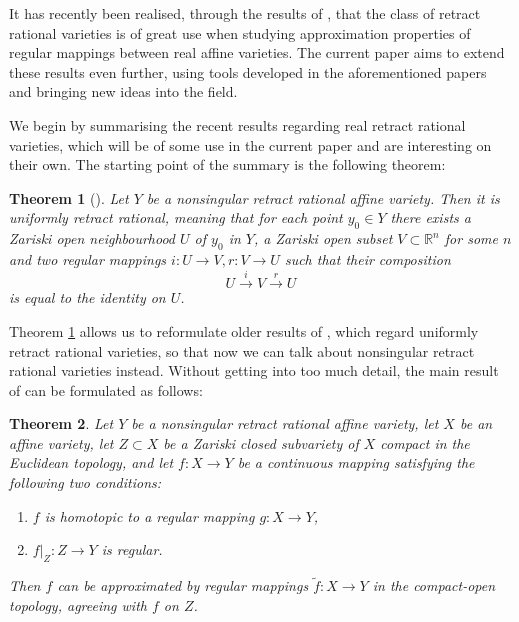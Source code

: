 \documentclass{article}
\theoremstyle{plain}
\newtheorem{thm}{Theorem}[section]
\theoremstyle{definition}
\theoremstyle{remark}
\newcommand{\R}{\mathbb{R}}
\begin{document}
It has recently been realised, through the results of \cite{baneckiRelativeStoneWeierstrassTheorem2024,baneckiRetractRationalVarieties2025}, that the class of retract rational varieties is of great use when studying approximation properties of regular mappings between real affine varieties. The current paper aims to extend these results even further, using tools developed in the aforementioned papers and bringing new ideas into the field. 

We begin by summarising the recent results regarding real retract rational varieties, which will be of some use in the current paper and are interesting on their own. The starting point of the summary is the following theorem:
\begin{thm}[{\cite[Theorem 1.8]{baneckiRetractRationalVarieties2025}}]\label{baneckiRetractRationalVarieties2025}
Let $Y$ be a nonsingular retract rational affine variety. Then it is \emph{uniformly retract rational}, meaning that for each point $y_0\in Y$ there exists a Zariski open neighbourhood $U$ of $y_0$ in $Y$, a Zariski open subset $V\subset \R^n$ for some $n$ and two regular mappings $i:U\rightarrow V, r:V\rightarrow U$ such that their composition
\begin{equation*}
    U\xrightarrow{i} V\xrightarrow{r} U 
\end{equation*}
is equal to the identity on $U$.
\end{thm}

Theorem \ref{baneckiRetractRationalVarieties2025} allows us to reformulate older results of \cite{baneckiRelativeStoneWeierstrassTheorem2024}, which regard uniformly retract rational varieties, so that now we can talk about nonsingular retract rational varieties instead. Without getting into too much detail, the main result of \cite{baneckiRelativeStoneWeierstrassTheorem2024} can be formulated as follows:
\begin{thm}\label{approx_thm}
Let $Y$ be a nonsingular retract rational affine variety, let $X$ be an affine variety, let $Z\subset X$ be a Zariski closed subvariety of $X$ compact in the Euclidean topology, and let $f:X\rightarrow Y$ be a continuous mapping satisfying the following two conditions:
\begin{enumerate}
    \item $f$ is homotopic to a regular mapping $g:X\rightarrow Y$,
    \item $f\vert_Z:Z\rightarrow Y$ is regular. 
\end{enumerate}
Then $f$ can be approximated by regular mappings $\widetilde{f}:X\rightarrow Y$ in the compact-open topology, agreeing with $f$ on $Z$.
\end{thm}
\end{document}
